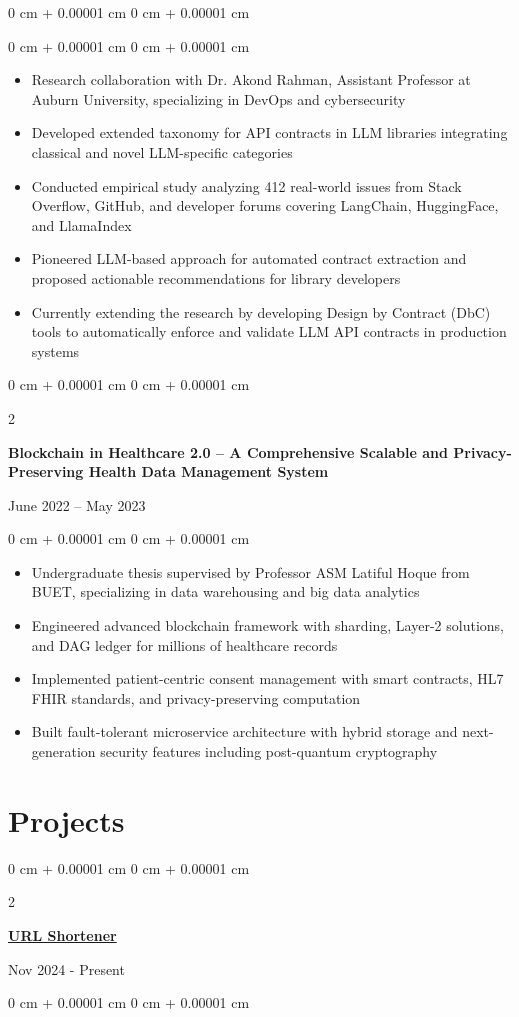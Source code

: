 \documentclass[10pt, letterpaper]{article}
\newenvironment{highlights}{
    \begin{itemize}[
        topsep=0.10 cm,
        parsep=0.10 cm,
        partopsep=0pt,
        itemsep=0pt,
        leftmargin=0 cm + 10pt
    ]
}{
    \end{itemize}
} %
\newenvironment{onecolentry}{
    \begin{adjustwidth}{
        0 cm + 0.00001 cm
    }{
        0 cm + 0.00001 cm
    }
}{
    \end{adjustwidth}
} %
\newenvironment{twocolentry}[2][]{
    \onecolentry
    \def\secondColumn{#2}
    \setcolumnwidth{\fill, 4.5 cm}
    \begin{paracol}{2}
}{
    \switchcolumn \raggedleft \secondColumn
    \end{paracol}
    \endonecolentry
} %
\begin{document}
\begin{onecolentry}
\begin{onecolentry}
    \begin{highlights}
        \item Research collaboration with Dr. Akond Rahman, Assistant Professor at Auburn University, specializing in DevOps and cybersecurity
        \item Developed extended taxonomy for API contracts in LLM libraries integrating classical and novel LLM-specific categories
        \item Conducted empirical study analyzing 412 real-world issues from Stack Overflow, GitHub, and developer forums covering LangChain, HuggingFace, and LlamaIndex
        \item Pioneered LLM-based approach for automated contract extraction and proposed actionable recommendations for library developers
        \item Currently extending the research by developing Design by Contract (DbC) tools to automatically enforce and validate LLM API contracts in production systems
    \end{highlights}
\end{onecolentry}

\begin{twocolentry}{
    {June 2022 – May 2023}
}
    \textbf{Blockchain in Healthcare 2.0 -- A Comprehensive Scalable and Privacy-Preserving Health Data Management System}
\end{twocolentry}

\begin{onecolentry}
    \begin{highlights}
        \item Undergraduate thesis supervised by Professor ASM Latiful Hoque from BUET, specializing in data warehousing and big data analytics
        \item Engineered advanced blockchain framework with sharding, Layer-2 solutions, and DAG ledger for millions of healthcare records
        \item Implemented patient-centric consent management with smart contracts, HL7 FHIR standards, and privacy-preserving computation
        \item Built fault-tolerant microservice architecture with hybrid storage and next-generation security features including post-quantum cryptography
    \end{highlights}
\end{onecolentry}

\section{Projects}
               \begin{twocolentry}{
            {Nov 2024 - Present}
        }
            \href{https://github.com/thromel/URLShortener}{\textbf{URL Shortener}}
        \end{twocolentry}
        \begin{onecolentry}
            \begin{highlights}
                

\end{highlights}
\end{onecolentry}
\end{onecolentry}
\end{document}
